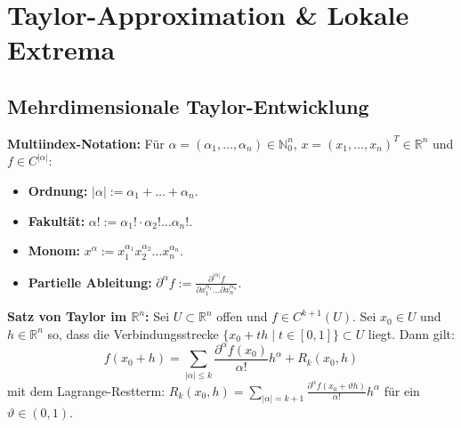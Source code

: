 \section{Taylor-Approximation \& Lokale Extrema}

\subsection{Mehrdimensionale Taylor-Entwicklung}

\begin{definition}
    \textbf{Multiindex-Notation:} Für $\alpha = (\alpha_1, \dots, \alpha_n) \in \mathbb{N}_0^n$, $x = (x_1, \dots, x_n)^T \in \mathbb{R}^n$ und $f \in C^{|\alpha|}$:
    \begin{itemize}
        \item \textbf{Ordnung:} $|\alpha| := \alpha_1 + \dots + \alpha_n$.
        \item \textbf{Fakultät:} $\alpha! := \alpha_1! \cdot \alpha_2! \dots \alpha_n!$.
        \item \textbf{Monom:} $x^\alpha := x_1^{\alpha_1} x_2^{\alpha_2} \dots x_n^{\alpha_n}$.
        \item \textbf{Partielle Ableitung:} $\partial^\alpha f := \frac{\partial^{|\alpha|} f}{\partial x_1^{\alpha_1} \dots \partial x_n^{\alpha_n}}$.
    \end{itemize}
\end{definition}

\begin{theorem}
    \textbf{Satz von Taylor im $\mathbb{R}^n$:} Sei $U \subset \mathbb{R}^n$ offen und $f \in C^{k+1}(U)$. Sei $x_0 \in U$ und $h \in \mathbb{R}^n$ so, dass die Verbindungsstrecke $\{x_0 + t h \mid t \in [0, 1]\} \subset U$ liegt. Dann gilt:
    $$ f(x_0 + h) = \sum_{|\alpha| \le k} \frac{\partial^\alpha f(x_0)}{\alpha!} h^\alpha + R_k(x_0, h) $$
    mit dem Lagrange-Restterm: $R_k(x_0, h) = \sum_{|\alpha| = k+1} \frac{\partial^\alpha f(x_0 + \vartheta h)}{\alpha!} h^\alpha$ für ein $\vartheta \in (0, 1)$.
\end{theorem}

